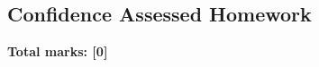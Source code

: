\documentclass[../s1]{subfiles}
\begin{document}
\subsection*{Confidence Assessed Homework}
\thispagestyle{fancy}



\begin{flushright}
\textbf{Total marks: [0]}
\end{flushright}
\end{document}
